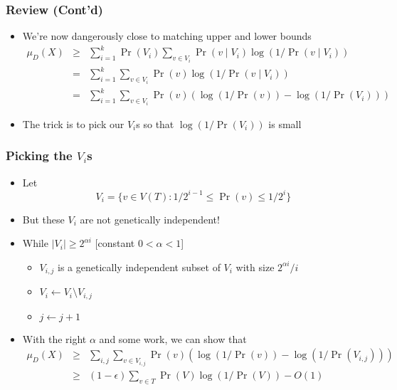 \documentclass{beamer}
\begin{document}


\frame
{
	\frametitle{Review (Cont'd)}

 	\begin{itemize}
	\item<1-> We're now dangerously close to matching upper and lower bounds
        \begin{eqnarray*}
	\mu_D(X) &\ge &\sum_{i=1}^k
	   \Pr(V_i)\sum_{v\in V_i} \Pr(v\mid V_i)\log(1/\Pr(v\mid V_i)) \\
	& = &\sum_{i=1}^k\sum_{v\in V_i} 
		\Pr(v)\log(1/\Pr(v\mid V_i)) \\
	& = &\sum_{i=1}^k\sum_{v\in V_i} 
		\Pr(v)(\log(1/\Pr(v))-\log(1/\Pr(V_i)))
	\end{eqnarray*}
	\item<2-> The trick is to pick our $V_i$s so that
$\log(1/\Pr(V_i))$ is small
	\end{itemize}

}


\frame
{
	\frametitle{Picking the $V_i$s}

	\begin{itemize}
	\item<1-> Let
	\[
		V_i=\{v\in V(T) :1/2^{i-1} \le \Pr(v) \le 1/2^i \}
	\]
	\item<2-> But these $V_i$ are not genetically independent!
 	\item<3-> While $|V_i|\ge 2^{\alpha i}$  [constant $0< \alpha
< 1$]
	   \begin{itemize}
		\item $V_{i,j}$ is a genetically independent subset of
			$V_i$ with size $2^{\alpha i}/i$
		\item $V_i\gets V_i\setminus V_{i,j}$
		\item $j\gets j+1$
	   \end{itemize}
	\item<4-> With the right $\alpha$ and some work, we can show that
	\begin{eqnarray*}
	\mu_D(X) & \ge & \sum_{i,j}\sum_{v\in V_{i,j}} 
		\Pr(v)(\log(1/\Pr(v))-\log(1/\Pr(V_{i,j}))) \\
	& \ge & \left(1-\epsilon\right)\sum_{v\in T}\Pr(V)\log(1/\Pr(V)) -
O(1)
	\end{eqnarray*}
	\end{itemize}
}
\end{document}
